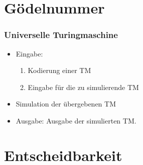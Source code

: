 



\section{Gödelnummer}


\begin{frame}
	\frametitle{Universelle Turingmaschine}
\begin{itemize}
	\item Eingabe:
	\begin{enumerate}
	\item Kodierung einer TM
	\item Eingabe für die zu simulierende TM
	\end{enumerate}
	\item Simulation der übergebenen TM
	\item Ausgabe: Ausgabe der simulierten TM.
	\end{itemize}
\end{frame}
\section{Entscheidbarkeit}
